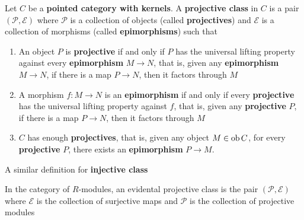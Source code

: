 \begin{definition}
	Let $C$ be a \textbf{pointed category with kernels}. A \textbf{projective class} in $C$ is a pair $(\mathcal{P}, \mathcal{E})$ where $\mathcal{P}$ is a collection of objects (called \textbf{projectives}) and $\mathcal{E}$ is a collection of morphisms (called \textbf{epimorphisms}) such that
	\begin{enumerate}
		\item An object $P$ is \textbf{projective} if and only if $P$ has the universal lifting property against every \textbf{epimorphism} $M \to N$, that is, given any \textbf{epimorphism} $M \to N$, if there is a map $P \to N$, then it factors through $M$
		\begin{center}
		\end{center}
		
		\item A morphism $f: M \to N$ is an \textbf{epimorphism} if and only if every \textbf{projective} has the universal lifting property against $f$, that is, given any \textbf{projective} $P$, if there is a map $P \to N$, then it factors through $M$
		
		\begin{center}
		\end{center}
		
		\item $C$ has enough \textbf{projectives}, that is, given any object $M \in \operatorname{ob} C$, for every \textbf{projective} $P$, there exists an \textbf{epimorphism} $P \to M$.
	\end{enumerate}
	
	A similar definition for \textbf{injective class}
\end{definition}

\begin{remark}
	In the category of $R$-modules, an evidental projective class is the pair $(\mathcal{P}, \mathcal{E})$ where $\mathcal{E}$ is the collection of surjective maps and $\mathcal{P}$ is the collection of projective modules
\end{remark}

